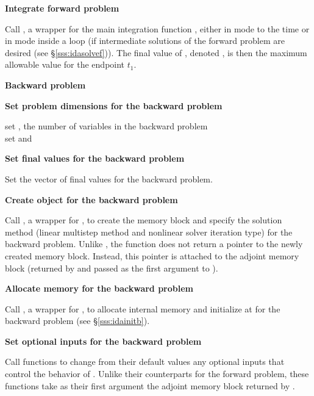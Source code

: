 \begin{Steps}
\item
  {\bf Integrate forward problem}

  Call , a wrapper for the {\idas} main integration
  function , either in  mode to the time 
   or in  mode inside a loop (if intermediate
  solutions of the forward problem are desired (see \S\ref{sss:idasolvef})).
  The final value of , denoted , is then
  the maximum allowable value for the endpoint $t_1$.

  \vspace{0.2in}\centerline{\bf Backward problem}

\item \label{i:back_start}
  {\bf Set problem dimensions for the backward problem}

  {\s} set , the number of variables in the backward problem \\
  {\p} set  and 

\item
  {\bf Set final values for the backward problem}

  Set the vector  of final values for the backward problem.

\item
  {\bf Create {\idas} object for the backward problem}

  Call , a wrapper for , to
  create the {\idas} memory block and specify the solution method
  (linear multistep method and nonlinear solver iteration type) for
  the backward problem. Unlike , the function 
  does not return a pointer to the newly created memory block. Instead,
  this pointer is attached to the adjoint memory block (returned by
   and passed as the first argument to ).

\item
  {\bf Allocate memory for the backward problem}

  Call , a wrapper for , to 
  allocate internal memory and initialize {\idas} at  for 
  the backward problem (see \S\ref{sss:idainitb}).

\item
  {\bf Set optional inputs for the backward problem}

  Call  functions to change from their default values
  any optional inputs that control the behavior of {\idas}. Unlike
  their counterparts for the forward problem, these functions take as
  their first argument the adjoint memory block returned by .


\end{Steps}
